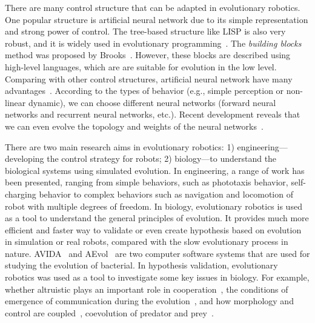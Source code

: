 There are many control structure that can be adapted in evolutionary robotics. One popular structure is artificial neural network due to its simple representation and strong power of control. The tree-based structure like LISP is also very robust, and it is widely used in evolutionary programming~\cite{Koza:1992}. The \textit{building blocks} method was proposed by Brooks~\cite{Brooks92artificiallife}. However, these blocks are described using high-level languages, which are are suitable for evolution in the low level. Comparing with other control structures, artificial neural network have many advantages~\cite{Floreano_1997, Floreano2008:NN}. According to the types of behavior (e.g., simple perception or non-linear dynamic), we can choose different neural networks (forward neural networks and recurrent neural networks, etc.). Recent development reveals that we can even evolve the topology and weights of the neural networks~\cite{Kenneth2002}. 

There are two main research aims in evolutionary robotics: 1) engineering---developing the control strategy for robots; 2) biology---to understand the biological systems using simulated evolution. In engineering, a range of work has been presented, ranging from simple behaviors, such as phototaxis behavior, self-charging behavior to complex behaviors such as navigation and locomotion of robot with multiple degrees of freedom. In biology, evolutionary robotics is used as a tool to understand the general principles of evolution. It provides much more efficient and faster way to validate or even create hypothesis based on evolution in simulation or real robots, compared with the slow evolutionary process in nature. AVIDA~\cite{Bryson2013} and AEvol~\cite{Batut2013} are two computer software systems that are used for studying the evolution of bacterial. In hypothesis validation, evolutionary robotics was used as a tool to investigate some key issues in biology. For example, whether altruistic plays an important role in cooperation~\cite{montanier:inria2011,Waibel2011}, the conditions of emergence of communication during the evolution~\cite{Floreano2007514}, and how morphology and control are coupled~\cite{Auerbach:PLoS:2014}, coevolution of predator and prey~\cite{Cliff_1995, Floreano_1998}. 

